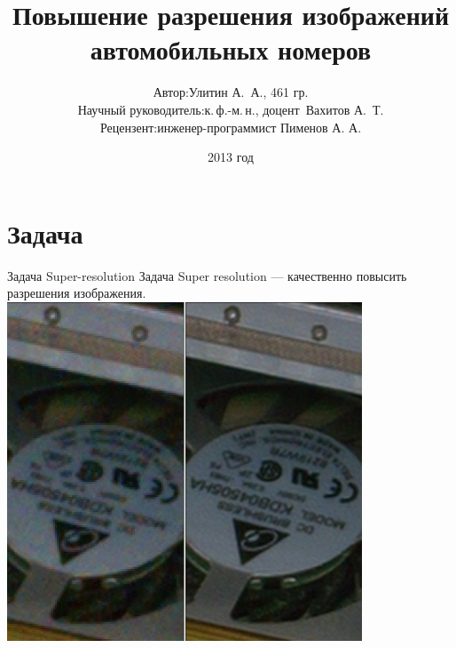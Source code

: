 \title{Повышение разрешения изображений автомобильных номеров}
\author{
  \begin{tabular}[4cm]{rl}
 Автор:                & Улитин А.~А., 461 гр. \\
 Научный руководитель: & к.\,ф.-м.\,н., доцент~Вахитов А.~Т. \\
 Рецензент: & инженер-программист Пименов А. А. \\
 \end{tabular}
 }
\date{2013 год}

\begin{frame}{}
		\maketitle
\end{frame}

\section{Задача}
\begin{frame}{Задача Super-resolution}
  Задача Super resolution --- качественно повысить разрешения изображения.
  \includegraphics[height=\textheight]{content/An_example_of_super_resolution_with_still_RAW_photo.jpg}
\end{frame}

